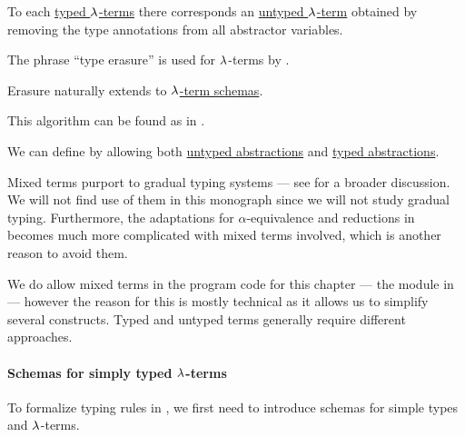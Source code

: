 \begin{algorithm}\label{alg:type_erasure}
  To each \hyperref[def:typed_lambda_term]{typed \( \mathrm{\lambda} \)-terms} there corresponds an \hyperref[def:lambda_term]{untyped \( \mathrm{\lambda} \)-term} obtained by removing the type annotations from all abstractor variables.
\end{algorithm}
\begin{comments}
  \item The phrase \enquote{type erasure} is used for \( \mathrm{\lambda} \)-terms by .
  \item Erasure naturally extends to \hyperref[def:simple_type_schema]{\( \mathrm{\lambda} \)-term schemas}.
  \item This algorithm can be found as  in \cite{notebook:code}.
\end{comments}

\begin{remark}\label{rem:mixed_lambda_term}\mimprovised
  We can define  by allowing both \hyperref[def:lambda_term]{untyped abstractions} and \hyperref[def:typed_lambda_term]{typed abstractions}.

  Mixed terms purport to gradual typing systems --- see  for a broader discussion. We will not find use of them in this monograph since we will not study gradual typing. Furthermore, the adaptations for \( \alpha \)-equivalence and reductions in  becomes much more complicated with mixed terms involved, which is another reason to avoid them.

  We do allow mixed terms in the program code for this chapter --- the module  in \cite{notebook:code} --- however the reason for this is mostly technical as it allows us to simplify several constructs. Typed and untyped terms generally require different approaches.
\end{remark}

\paragraph{Schemas for simply typed \( \mathrm{\lambda} \)-terms}\hfill

To formalize typing rules in , we first need to introduce schemas for simple types and \( \mathrm{\lambda} \)-terms.

